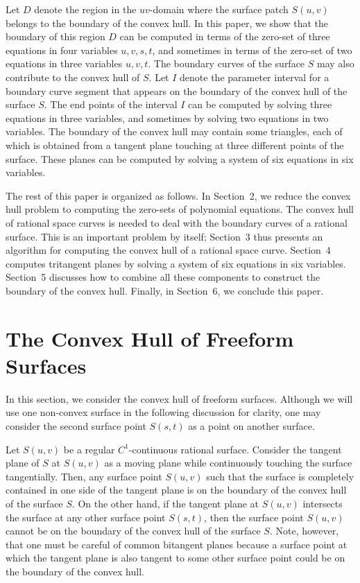 \documentclass[11pt]{article}          %
\begin{document}
Let $D$ denote the region in the $uv$-domain where the surface
patch $S(u,v)$ belongs to the boundary of the convex hull.
In this paper, we show that the boundary of this region $D$
can be computed in terms of the zero-set of three equations in
four variables $u,v,s,t$, and sometimes in terms of the zero-set of
two equations in three variables $u,v,t$.  The boundary curves
of the surface $S$ may also contribute to the convex hull of $S$.
Let $I$ denote the parameter interval for a boundary curve segment
that appears on the boundary of the convex hull of the surface $S$.
The end points of the interval $I$ can be computed
by solving three equations in three variables,
and sometimes by solving two equations in two variables.
The boundary of the convex hull may contain some triangles,
each of which is obtained from a tangent plane touching at three 
different points of the surface.  These planes can be computed
by solving a system of six equations in six variables.

The rest of this paper is organized as follows.
In Section~2, we reduce the convex hull problem to
computing the zero-sets of polynomial equations.
The convex hull of rational space curves is needed
to deal with the boundary curves of a rational surface.
This is an important problem by itself;
Section~3 thus presents an algorithm for computing
the convex hull of a rational space curve.
Section~4 computes tritangent planes by solving
a system of six equations in six variables.  
Section~5 discusses how to combine all these components
to construct the boundary of the convex hull.
Finally, in Section~6, we conclude this paper.


\section{The Convex Hull of Freeform Surfaces}
\label{sec-ch-surface}

In this section, we consider the convex hull of freeform surfaces.
Although we will use one non-convex surface in the following discussion
for clarity,  one may consider the second surface point $S(s,t)$
as a point on another surface.

Let $S(u,v)$ be a regular $C^1$-continuous rational surface. 
Consider the tangent plane of $S$ at $S(u,v)$ as a moving plane
while continuously touching the surface tangentially.
Then, any surface point $S(u,v)$
such that the surface is completely contained in one side of
the tangent plane is on the boundary of the convex hull of
the surface $S$. On the other hand, if the tangent plane at $S(u,v)$ 
intersects the surface at any other surface point $S(s,t)$, then
the surface point $S(u,v)$ cannot be on the boundary of
the convex hull of the surface $S$.
Note, however, that one must be careful of common bitangent planes because 
a surface point at which the tangent plane is also tangent to some
other surface point could be on the boundary of the convex hull. 
\end{document}
